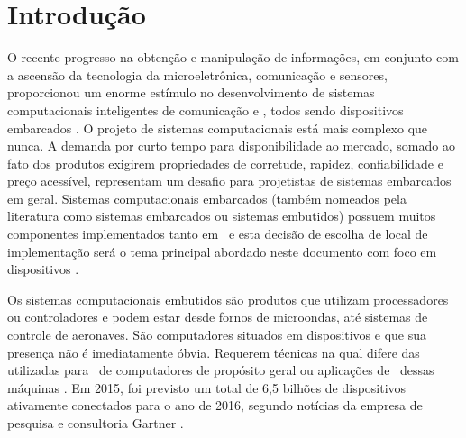 \chapter{Introdução} \label{chap:introducao}

	O recente progresso na obtenção e manipulação de informações, em conjunto com a ascensão da tecnologia da microeletrônica, comunicação e sensores, proporcionou um enorme estímulo no desenvolvimento de sistemas computacionais inteligentes de comunicação e \wearables, todos sendo dispositivos embarcados \citep{Jozwiak2017}.
	O projeto de sistemas computacionais está mais complexo que nunca. A demanda por curto tempo para disponibilidade ao mercado, somado ao fato dos produtos exigirem propriedades de corretude, rapidez, confiabilidade e preço acessível, representam um desafio para projetistas de sistemas embarcados em geral.
	Sistemas computacionais embarcados (também nomeados pela literatura como sistemas embarcados ou sistemas embutidos) possuem muitos componentes implementados tanto em \hs\ e esta decisão de escolha de local de implementação será o tema principal abordado neste documento com foco em dispositivos \wearable.

	Os sistemas computacionais embutidos são produtos que utilizam processadores ou controladores e podem estar desde fornos de microondas, até sistemas de controle de aeronaves.
   São computadores situados em dispositivos e que sua presença não é imediatamente óbvia.
	Requerem técnicas na qual difere das utilizadas para \design\ de computadores de propósito geral ou aplicações de \software\ dessas máquinas \citep{Wolf1994}.  
	Em 2015, foi previsto um total de 6,5 bilhões de dispositivos ativamente conectados para o ano de 2016, segundo notícias da empresa de pesquisa e consultoria Gartner \citep{RobvanderMeulen2015}.
	
